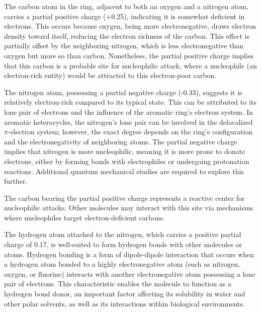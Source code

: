 The carbon atom in the ring, adjacent to both an oxygen and a nitrogen atom, carries a partial positive charge (+0.25), indicating it is somewhat deficient in electrons. This occurs because oxygen, being more electronegative, draws electron density toward itself, reducing the electron richness of the carbon. This effect is partially offset by the neighboring nitrogen, which is less electronegative than oxygen but more so than carbon. Nonetheless, the partial positive charge implies that this carbon is a probable site for nucleophilic attack, where a nucleophile (an electron-rich entity) would be attracted to this electron-poor carbon.

The nitrogen atom, possessing a partial negative charge (-0.33), suggests it is relatively electron-rich compared to its typical state. This can be attributed to its lone pair of electrons and the influence of the aromatic ring's electron system. In aromatic heterocycles, the nitrogen's lone pair can be involved in the delocalized $\pi$-electron system; however, the exact degree depends on the ring’s configuration and the electronegativity of neighboring atoms. The partial negative charge implies that nitrogen is more nucleophilic, meaning it is more prone to donate electrons, either by forming bonds with electrophiles or undergoing protonation reactions. Additional quantum mechanical studies are required to explore this further.

The carbon bearing the partial positive charge represents a reactive center for nucleophilic attacks. Other molecules may interact with this site via mechanisms where nucleophiles target electron-deficient carbons.

The hydrogen atom attached to the nitrogen, which carries a positive partial charge of 0.17, is well-suited to form hydrogen bonds with other molecules or atoms. Hydrogen bonding is a form of dipole-dipole interaction that occurs when a hydrogen atom bonded to a highly electronegative atom (such as nitrogen, oxygen, or fluorine) interacts with another electronegative atom possessing a lone pair of electrons. This characteristic enables the molecule to function as a hydrogen bond donor, an important factor affecting its solubility in water and other polar solvents, as well as its interactions within biological environments.

